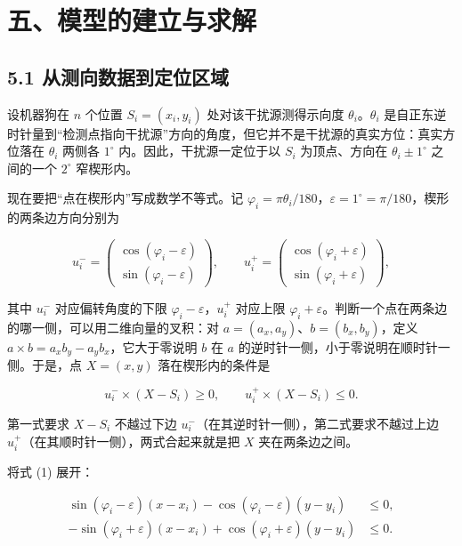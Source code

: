 \documentclass[UTF8,a4paper,zihao=-4,fontset=fandol]{ctexart}
\begin{document}
\thispagestyle{plain}
\section*{五、模型的建立与求解}

\subsection*{5.1 从测向数据到定位区域}

设机器狗在 $n$ 个位置 $S_i=(x_i,y_i)$ 处对该干扰源测得示向度 $\theta_i$。$\theta_i$ 是自正东逆时针量到“检测点指向干扰源”方向的角度，但它并不是干扰源的真实方位：真实方位落在 $\theta_i$ 两侧各 $1^\circ$ 内。因此，干扰源一定位于以 $S_i$ 为顶点、方向在 $\theta_i\pm1^\circ$ 之间的一个 $2^\circ$ 窄楔形内。

现在要把“点在楔形内”写成数学不等式。记 $\varphi_i=\pi\theta_i/180$，$\varepsilon=1^\circ=\pi/180$，楔形的两条边方向分别为

\[
u_i^-=\begin{pmatrix}\cos(\varphi_i-\varepsilon)\\ \sin(\varphi_i-\varepsilon)\end{pmatrix},\qquad
u_i^+=\begin{pmatrix}\cos(\varphi_i+\varepsilon)\\ \sin(\varphi_i+\varepsilon)\end{pmatrix},
\]

其中 $u_i^-$ 对应偏转角度的下限 $\varphi_i-\varepsilon$，$u_i^+$ 对应上限 $\varphi_i+\varepsilon$。判断一个点在两条边的哪一侧，可以用二维向量的叉积：对 $a=(a_x,a_y)$、$b=(b_x,b_y)$，定义 $a\times b=a_xb_y-a_yb_x$，它大于零说明 $b$ 在 $a$ 的逆时针一侧，小于零说明在顺时针一侧。于是，点 $X=(x,y)$ 落在楔形内的条件是

\[
u_i^-\times(X-S_i)\ge 0,\qquad u_i^+\times(X-S_i)\le 0. \tag{1}
\]

第一式要求 $X-S_i$ 不越过下边 $u_i^-$（在其逆时针一侧），第二式要求不越过上边 $u_i^+$（在其顺时针一侧），两式合起来就是把 $X$ 夹在两条边之间。

将式 (1) 展开：

\[
\begin{aligned}
\sin(\varphi_i-\varepsilon)(x-x_i)-\cos(\varphi_i-\varepsilon)(y-y_i)&\le 0,\\
-\sin(\varphi_i+\varepsilon)(x-x_i)+\cos(\varphi_i+\varepsilon)(y-y_i)&\le 0.
\end{aligned}
\tag{2}
\]
\end{document}
